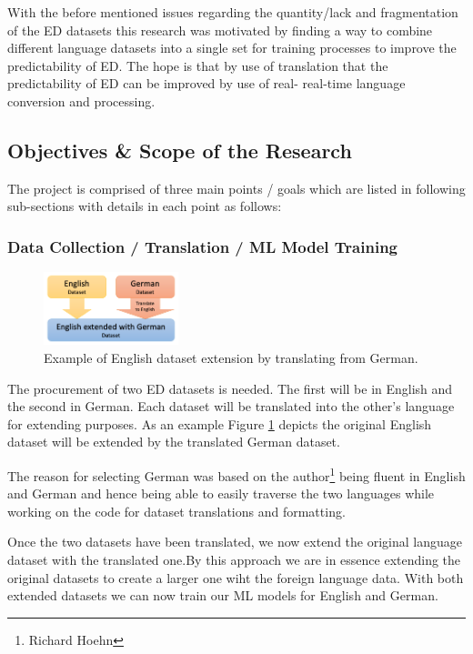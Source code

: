 \documentclass[11pt]{article}
\begin{document}
With the before mentioned issues regarding the quantity/lack and fragmentation of the ED datasets this research was motivated by finding a way to combine different language datasets into a single set for training processes to improve the predictability of ED. The hope is that by use of translation that the predictability of ED can be improved by use of real- real-time language conversion and processing.

\subsection{Objectives \& Scope of the Research}
The project is comprised of three main points / goals which are listed in following sub-sections with details in each point as follows:

\subsubsection{Data Collection / Translation / ML Model Training}

\begin{figure} %
    \centering
    \includegraphics[width=0.35\textwidth]{Dataset-Extension}
    \caption{Example of English dataset extension by translating from German.}
    \label{fig:dataset-extension}
\end{figure}

The procurement of two ED datasets is needed. The first will be in English and the second in German. Each dataset will be translated into the other’s language for extending purposes. As an example Figure \ref{fig:dataset-extension} depicts the original English dataset will be extended by the translated German dataset.

The reason for selecting German was based on the author\footnote{Richard Hoehn} being fluent in English and German and hence being able to easily traverse the two languages while working on the code for dataset translations and formatting.

Once the two datasets have been translated, we now extend the original language dataset with the translated one.By this approach we are in essence extending the original datasets to create a larger one wiht the foreign language data. With both extended datasets we can now train our ML models for English and German.
\end{document}
